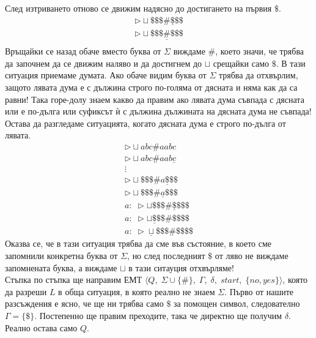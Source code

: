 \documentclass[14pt]{extarticle}
\begin{document}
След изтриването отново се движим надясно до достигането на първия \(\$\).
\begin{align*}
    \triangleright \sqcup \$\$\$ \# \underline{\$}\$\$ \\
    \triangleright \sqcup \$\$\$ \underline{\#} \$\$\$ \\
\end{align*}
Връщайки се назад обаче вместо буква от \(\Sigma\) виждаме \(\#\),
което значи, че трябва да започнем да се движим наляво и да достигнем до \(\sqcup\) срещайки само \(\$\). В тази ситуация приемаме думата.
Ако обаче видим буква от \(\Sigma\) трябва да отхвърлим, защото лявата дума е с дължина строго по-голяма от дясната и няма как да са равни! Така горе-долу знаем какво да правим ако лявата дума съвпада с дясната или е по-дълга или суфиксът ѝ с дължина дължината на дясната дума не съвпада!
Остава да разгледаме ситуацията, когато дясната дума е строго по-дълга от лявата.
\begin{align*}
    \triangleright \sqcup abc \# aabc \\
    \triangleright \sqcup abc \# aab\underline{c} \\
    \vdots \\
    \triangleright \sqcup \$\$\$ \# a\underline{\$}\$\$ \\
    \triangleright \sqcup \$\$\$ \# \underline{a}\$\$\$ \\
    a: \; \triangleright \sqcup \$\$\$ \# \underline{\$}\$\$\$ \\
    a: \; \triangleright \sqcup \underline{\$}\$\$ \# \$\$\$\$ \\
    a: \; \triangleright \underline{\sqcup}\$\$\$ \# \$\$\$\$
\end{align*}
Оказва се, че в тази ситуация трябва да сме във състояние, в което сме запомнили конкретна буква от \(\Sigma\), но след последният \(\$\) от ляво не виждаме запомнената буква, а виждаме \(\sqcup\) в тази ситауция отхвърляме! \\

Стъпка по стъпка ще направим ЕМТ \(\langle Q,\; \Sigma \cup \{\#\},\; \Gamma,\; \delta,\; start,\; \{no, yes\} \rangle\),
която да разреши \(L\) в обща ситуация, в която реално не знаем \(\Sigma\).
Първо от нашите разсъждения е ясно, че ще ни трябва само \(\$\) за помощен символ, следователно \(\Gamma = \{\$\}\).
Постепенно ще правим преходите, така че директно ще получим \(\delta\). Реално остава само \(Q\). \\
\end{document}
